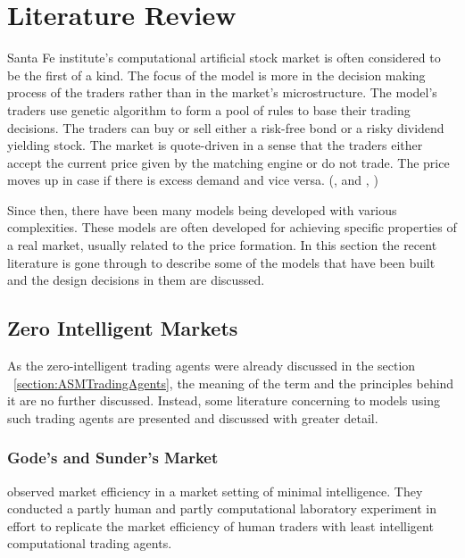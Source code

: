 \section{Literature Review}

Santa Fe institute's computational artificial stock 
market is often considered to be the first of a kind. 
The focus of the model is more in the 
decision making process of the traders rather than in the 
market's microstructure. The model's traders use 
genetic algorithm to form a pool of rules to base
their trading decisions. The traders can buy or
sell either a risk-free bond or a risky dividend yielding stock.
The market is quote-driven in a sense that the traders
either accept the current price given by the matching engine
or do not trade. The price moves up in case if there is excess
demand and vice versa. (\citeauthor{SantaFe94}, \citeyear{SantaFe94} 
and \citeauthor{SantaFe99}, \citeyear{SantaFe99})

Since then, there have been many models being 
developed with various complexities. These models are often developed
for achieving specific properties of a real market, 
usually related to the price formation. In this section
the recent literature is gone through to describe some of the models %
that have been built and the design decisions in them are discussed.


\subsection{Zero Intelligent Markets}


As the zero-intelligent trading agents were already discussed in the section 
~\ref{section:ASMTradingAgents}, the meaning of the term and the principles %
behind it are no further discussed. Instead, some literature concerning to 
models using such trading agents are presented and discussed with greater detail.

\subsubsection{Gode's and Sunder's Market}
\citet{God93} observed market efficiency in a market setting
of minimal intelligence. They conducted a partly human and partly
computational laboratory experiment in effort to replicate the market
efficiency of human traders with least intelligent computational
trading agents.

